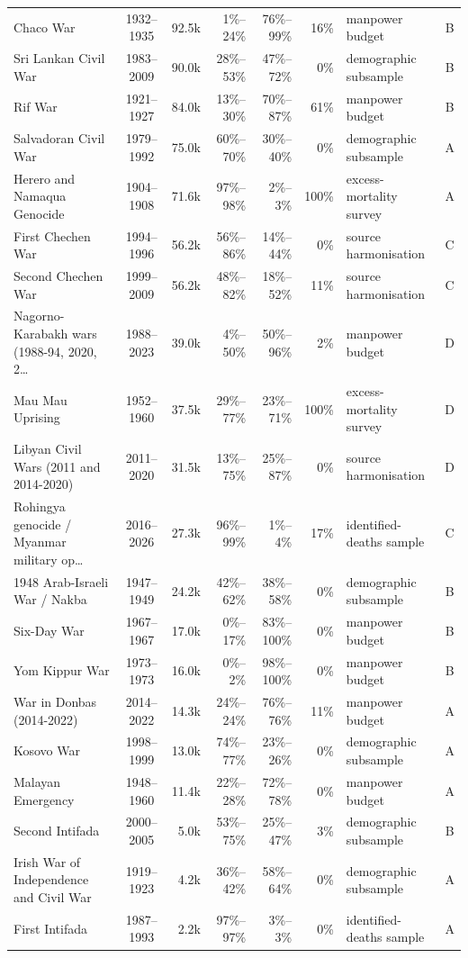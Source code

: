 \documentclass[11pt]{article}
\begin{document}
\begin{scriptsize}
\begin{longtable}{p{4.7cm} c r r r r p{2.8cm} c}
Chaco War & 1932--1935 & 92.5k & 1\%--24\% & 76\%--99\% & 16\% & manpower budget & B \\
Sri Lankan Civil War & 1983--2009 & 90.0k & 28\%--53\% & 47\%--72\% & 0\% & demographic subsample & B \\
Rif War & 1921--1927 & 84.0k & 13\%--30\% & 70\%--87\% & 61\% & manpower budget & B \\
Salvadoran Civil War & 1979--1992 & 75.0k & 60\%--70\% & 30\%--40\% & 0\% & demographic subsample & A \\
Herero and Namaqua Genocide & 1904--1908 & 71.6k & 97\%--98\% & 2\%--3\% & 100\% & excess-mortality survey & A \\
First Chechen War & 1994--1996 & 56.2k & 56\%--86\% & 14\%--44\% & 0\% & source harmonisation & C \\
Second Chechen War & 1999--2009 & 56.2k & 48\%--82\% & 18\%--52\% & 11\% & source harmonisation & C \\
Nagorno-Karabakh wars (1988-94, 2020, 2\ldots{} & 1988--2023 & 39.0k & 4\%--50\% & 50\%--96\% & 2\% & manpower budget & D \\
Mau Mau Uprising & 1952--1960 & 37.5k & 29\%--77\% & 23\%--71\% & 100\% & excess-mortality survey & D \\
Libyan Civil Wars (2011 and 2014-2020) & 2011--2020 & 31.5k & 13\%--75\% & 25\%--87\% & 0\% & source harmonisation & D \\
Rohingya genocide / Myanmar military op\ldots{} & 2016--2026 & 27.3k & 96\%--99\% & 1\%--4\% & 17\% & identified-deaths sample & C \\
1948 Arab-Israeli War / Nakba & 1947--1949 & 24.2k & 42\%--62\% & 38\%--58\% & 0\% & demographic subsample & B \\
Six-Day War & 1967--1967 & 17.0k & 0\%--17\% & 83\%--100\% & 0\% & manpower budget & B \\
Yom Kippur War & 1973--1973 & 16.0k & 0\%--2\% & 98\%--100\% & 0\% & manpower budget & B \\
War in Donbas (2014-2022) & 2014--2022 & 14.3k & 24\%--24\% & 76\%--76\% & 11\% & manpower budget & A \\
Kosovo War & 1998--1999 & 13.0k & 74\%--77\% & 23\%--26\% & 0\% & demographic subsample & A \\
Malayan Emergency & 1948--1960 & 11.4k & 22\%--28\% & 72\%--78\% & 0\% & manpower budget & A \\
Second Intifada & 2000--2005 & 5.0k & 53\%--75\% & 25\%--47\% & 3\% & demographic subsample & B \\
Irish War of Independence and Civil War & 1919--1923 & 4.2k & 36\%--42\% & 58\%--64\% & 0\% & demographic subsample & A \\
First Intifada & 1987--1993 & 2.2k & 97\%--97\% & 3\%--3\% & 0\% & identified-deaths sample & A \\
\bottomrule
\end{longtable}
\end{scriptsize}
\end{document}
